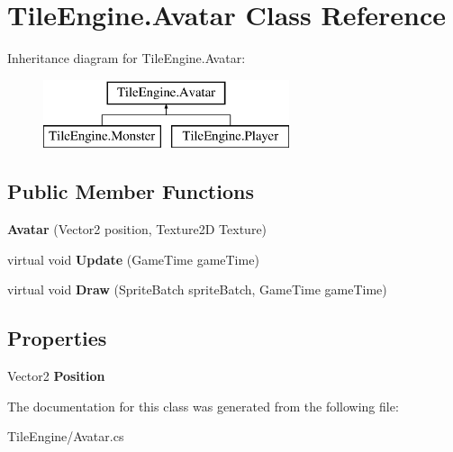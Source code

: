 \hypertarget{class_tile_engine_1_1_avatar}{\section{Tile\-Engine.\-Avatar Class Reference}
\label{d3/d9f/class_tile_engine_1_1_avatar}
}
Inheritance diagram for Tile\-Engine.\-Avatar\-:\begin{figure}[H]
\begin{center}
\leavevmode
\includegraphics[height=2.000000cm]{d3/d9f/class_tile_engine_1_1_avatar}
\end{center}
\end{figure}
\subsection*{Public Member Functions}
\begin{DoxyCompactItemize}
\item 
\hypertarget{class_tile_engine_1_1_avatar_a9d97952e8a9e1b347c841cfbe614b60b}{{\bfseries Avatar} (Vector2 position, Texture2\-D Texture)}\label{d3/d9f/class_tile_engine_1_1_avatar_a9d97952e8a9e1b347c841cfbe614b60b}

\item 
\hypertarget{class_tile_engine_1_1_avatar_afa46c5a32ad8b677a0f2ce2ace163059}{virtual void {\bfseries Update} (Game\-Time game\-Time)}\label{d3/d9f/class_tile_engine_1_1_avatar_afa46c5a32ad8b677a0f2ce2ace163059}

\item 
\hypertarget{class_tile_engine_1_1_avatar_a7d6106cb2e838e335d7b285d51312183}{virtual void {\bfseries Draw} (Sprite\-Batch sprite\-Batch, Game\-Time game\-Time)}\label{d3/d9f/class_tile_engine_1_1_avatar_a7d6106cb2e838e335d7b285d51312183}

\end{DoxyCompactItemize}
\subsection*{Properties}
\begin{DoxyCompactItemize}
\item 
\hypertarget{class_tile_engine_1_1_avatar_a9c6796fe77c217cfe59d8d1bf96397d1}{Vector2 {\bfseries Position}}\label{d3/d9f/class_tile_engine_1_1_avatar_a9c6796fe77c217cfe59d8d1bf96397d1}

\end{DoxyCompactItemize}


The documentation for this class was generated from the following file\-:\begin{DoxyCompactItemize}
\item 
Tile\-Engine/Avatar.\-cs\end{DoxyCompactItemize}
